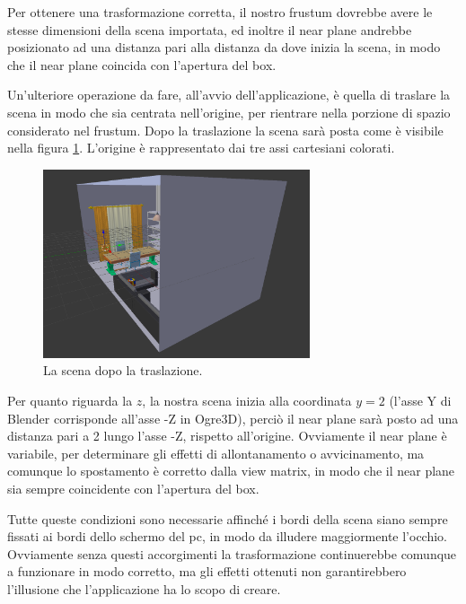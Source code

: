 Per ottenere una trasformazione corretta, il nostro frustum dovrebbe avere le stesse dimensioni della scena importata, ed inoltre il near plane andrebbe posizionato ad una distanza pari alla distanza da dove inizia la scena, in modo che il near plane coincida con l'apertura del box.

Un'ulteriore operazione da fare, all'avvio dell'applicazione, è quella di traslare la scena in modo che sia centrata nell'origine, per rientrare nella porzione di spazio considerato nel frustum.
Dopo la traslazione la scena sarà posta come è visibile nella figura \ref{transl-liv-room}. L'origine è rappresentato dai tre assi cartesiani colorati.

\begin{figure}[htbp]
\centering
\includegraphics[width=0.7\textwidth]{images/progetto/living-room-translated.png}
\caption{La scena dopo la traslazione.\label{transl-liv-room}}
\end{figure}


Per quanto riguarda la $z$, la nostra scena inizia alla coordinata $y=2$ (l'asse Y di Blender corrisponde all'asse -Z in Ogre3D), perciò il near plane sarà posto ad una distanza pari a 2 lungo l'asse -Z, rispetto all'origine. Ovviamente il near plane è variabile, per determinare gli effetti di allontanamento o avvicinamento, ma comunque lo spostamento è corretto dalla view matrix, in modo che il near plane sia sempre coincidente con l'apertura del box.

Tutte queste condizioni sono necessarie affinché i bordi della scena siano sempre fissati ai bordi dello schermo del pc, in modo da illudere maggiormente l'occhio. Ovviamente senza questi accorgimenti la trasformazione continuerebbe comunque a funzionare in modo corretto, ma gli effetti ottenuti non garantirebbero l'illusione che l'applicazione ha lo scopo di creare.
 

